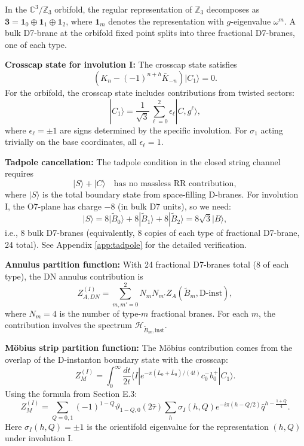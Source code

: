 \documentclass[11pt]{article}
\newcommand{\Z}{\mathbb{Z}}
\newcommand{\C}{\mathbb{C}}
\newcommand{\vt}{\vartheta}
\newcommand{\hq}{\hat{q}}
\newcommand{\htau}{\hat{\tau}}
\begin{document}
In the $\C^3/\Z_3$ orbifold, the regular representation of $\Z_3$ decomposes as $\mathbf{3} = \mathbf{1}_0 \oplus \mathbf{1}_1 \oplus \mathbf{1}_2$, where $\mathbf{1}_m$ denotes the representation with $g$-eigenvalue $\omega^m$. A bulk D7-brane at the orbifold fixed point splits into three fractional D7-branes, one of each type.

\textbf{Crosscap state for involution I:} The crosscap state satisfies
\begin{equation}
(K_n - (-1)^{n+h} \bar{K}_{-n})|C_1\rangle = 0.
\end{equation}
For the orbifold, the crosscap state includes contributions from twisted sectors:
\begin{equation}
|C_1\rangle = \frac{1}{\sqrt{3}} \sum_{\ell=0}^{2} \epsilon_\ell |C, g^\ell\rangle,
\end{equation}
where $\epsilon_\ell = \pm 1$ are signs determined by the specific involution. For $\sigma_1$ acting trivially on the base coordinates, all $\epsilon_\ell = 1$.

\textbf{Tadpole cancellation:} The tadpole condition in the closed string channel requires
\begin{equation}
|S\rangle + |C\rangle \quad \text{has no massless RR contribution},
\end{equation}
where $|S\rangle$ is the total boundary state from space-filling D-branes. For involution I, the O7-plane has charge $-8$ (in bulk D7 units), so we need:
\begin{equation}
|S\rangle = 8|\tilde{B}_0\rangle + 8|\tilde{B}_1\rangle + 8|\tilde{B}_2\rangle = 8\sqrt{3}|B\rangle,
\end{equation}
i.e., 8 bulk D7-branes (equivalently, 8 copies of each type of fractional D7-brane, 24 total). See Appendix \ref{app:tadpole} for the detailed verification.

\textbf{Annulus partition function:} With 24 fractional D7-branes total (8 of each type), the DN annulus contribution is
\begin{equation}
Z_{A,DN}^{(I)} = \sum_{m,m'=0}^{2} N_m N_{m'} Z_{A}(\tilde{B}_m, \text{D-inst}),
\end{equation}
where $N_m = 4$ is the number of type-$m$ fractional branes. For each $m$, the contribution involves the spectrum $\mathcal{H}_{\tilde{B}_m, \text{inst}}$.

\textbf{M\"obius strip partition function:} The M\"obius contribution comes from the overlap of the D-instanton boundary state with the crosscap:
\begin{equation}
Z_M^{(I)} = \int_0^\infty \frac{dt}{2t} \langle I | e^{-\pi(L_0+\bar{L}_0)/(4t)} c_0^- b_0^+ | C_1\rangle.
\end{equation}
Using the formula from Section E.3:
\begin{equation}
Z_M^{(I)} = \sum_{Q=0,1} (-1)^{1-Q} \vt_{1-Q,0}(2\htau) \sum_h \sigma_{I}(h,Q) e^{-i\pi(h-Q/2)} \hq^{h - \frac{1+Q}{4}}.
\end{equation}
Here $\sigma_I(h,Q) = \pm 1$ is the orientifold eigenvalue for the representation $(h,Q)$ under involution I.
\end{document}
